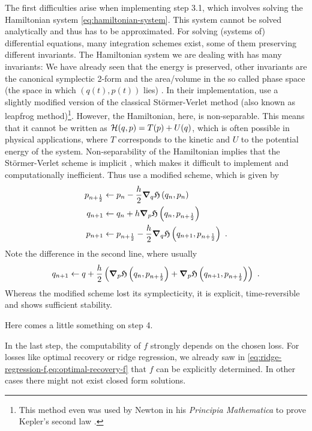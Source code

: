 The first difficulties arise when implementing step 3.1, which involves solving the Hamiltonian system \ref{eq:hamiltonian-system}.
This system cannot be solved analytically and thus has to be approximated.
For solving (systems of) differential equations, many integration schemes exist, some of them preserving different invariants.
The Hamiltonian system we are dealing with has many invariants:
We have already seen that the energy is preserved, other invariants are the canonical symplectic 2-form \cite{marsden10} and the area/volume in the so called phase space (the space in which $(q(t), p(t))$ lies) \cite{hairer06}.
In their implementation, \citet{owhadi20} use a slightly modified version of the classical Störmer-Verlet method (also known as leapfrog method)\footnote{This method even was used by Newton in his \emph{Principia Mathematica} to prove Kepler's second law \cite{hairer03}.}.
However, the Hamiltonian, here, is non-separable.
This means that it cannot be written as $\mathcal{H}(q, p) = T(p) + U(q)$, which is often possible in physical applications, where $T$ corresponds to the kinetic and $U$ to the potential energy of the system.
Non-separability of the Hamiltonian implies that the Störmer-Verlet scheme is implicit \cite{hairer06}, which makes it difficult to implement and computationally inefficient.
Thus \citet{owhadi20} use a modified scheme, which is given by
\begin{align}
	p_{n+\frac{1}{2}} &\gets p_n - \frac{h}{2} \grad_q\mathfrak{H}\left(q_n, p_n\right) \label{eq:leapfrog-p.5}\\
	q_{n+1} &\gets q_n + h \grad_p\mathfrak{H}\left(q_n, p_{n+\frac{1}{2}}\right)\\
	p_{n+1} &\gets p_{n+\frac{1}{2}} - \frac{h}{2} \grad_q\mathfrak{H}\left(q_{n+1}, p_{n+\frac{1}{2}}\right) \label{eq:leapfrog-p1}\ .
\end{align}
Note the difference in the second line, where usually 
\begin{equation}
q_{n+1} \gets q + \frac{h}{2} \left(\grad_p\mathfrak{H}\left(q_n, p_{n+\frac{1}{2}}\right) + \grad_p\mathfrak{H}\left(q_{n+1}, p_{n+\frac{1}{2}}\right)\right) \ .
\end{equation}
Whereas the modified scheme lost its symplecticity, it is explicit, time-reversible and shows sufficient stability.

Here comes a little something on step 4.

In the last step, the computability of $f$ strongly depends on the chosen loss.
For losses like optimal recovery or ridge regression, we already saw in \cref{eq:ridge-regression-f,eq:optimal-recovery-f} that $f$ can be explicitly determined.
In other cases there might not exist closed form solutions.

